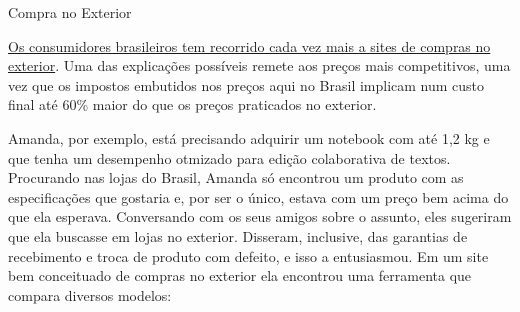 \begin{task}{Compra no Exterior}

\href{https://www.folhanit.com.br/2018/09/17/brasileiros-gastam-cada-vez-mais-em-sites-de-compras-internacionais/}{Os consumidores brasileiros tem recorrido cada vez mais a sites de compras no exterior}. Uma das explicações possíveis remete aos preços mais competitivos, uma vez que os impostos embutidos nos preços aqui no Brasil implicam num custo final até 60\% maior do que os preços praticados no exterior.

Amanda, por exemplo, está precisando adquirir um notebook com até 1,2 kg e que tenha um desempenho otmizado para edição colaborativa de textos. Procurando nas lojas do Brasil, Amanda só encontrou um produto com as especificações que gostaria e, por ser o único, estava com um preço bem acima do que ela esperava. Conversando com os seus amigos sobre o assunto, eles sugeriram que ela buscasse em lojas no exterior. Disseram, inclusive, das garantias de recebimento e troca de produto com defeito, e isso a entusiasmou. Em um site bem conceituado de compras no exterior ela encontrou uma ferramenta que compara diversos modelos:


\end{task}
